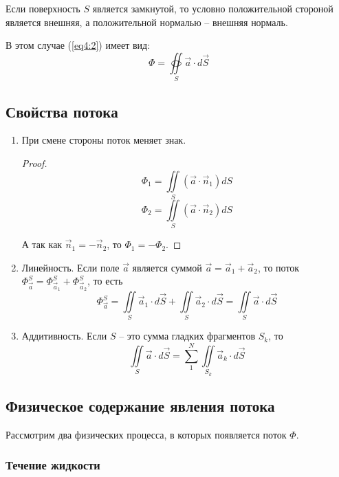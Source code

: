 	\begin{remark}
	Если поверхность \( S \) является замкнутой, то условно положительной стороной является внешняя, а положительной нормалью -- внешняя нормаль.
	
	В этом случае (\ref{eq4:2}) имеет вид:
	\begin{equation}
		\Phi = \oiint\limits_S \vec{a}\cdot d\vec{S}
	\end{equation}
	\end{remark}
	
\subsection{Свойства потока}

	\begin{enumerate}
	\item При смене стороны поток меняет знак.
	
	\begin{proof}
	\[ \Phi_1 = \iint\limits_S (\vec{a}\cdot\vec{n}_1)dS \]
	\[ \Phi_2 = \iint\limits_S (\vec{a}\cdot\vec{n}_2)dS \]
	
	А так как \( \vec{n}_1 = -\vec{n}_2 \), то \( \Phi_1 = -\Phi_2 \).
	\end{proof}
	
	\item Линейность.
	Если поле \( \vec{a} \) является суммой \( \vec{a} = \vec{a}_1 + \vec{a}_2 \), то поток \( \Phi_{\vec{a}}^S = \Phi_{\vec{a}_1}^S + \Phi_{\vec{a}_2}^S \), то есть
	\[ \Phi_{\vec{a}}^S = \iint\limits_S \vec{a}_1\cdot d\vec{S} + \iint\limits_S \vec{a}_2\cdot d\vec{S} = \iint\limits_S \vec{a}\cdot d\vec{S} \]
	
	\item Аддитивность.
	Если \( S \) -- это сумма гладких фрагментов \( S_k \), то
	\[ \iint\limits_S \vec{a}\cdot d\vec{S} = \sum\limits_1^N \iint\limits_{S_k} \vec{a}_k\cdot d\vec{S} \]
	
	\end{enumerate}
	
\subsection{Физическое содержание явления потока}

	Рассмотрим два физических процесса, в которых появляется поток \( \Phi \).
	
\subsubsection{Течение жидкости}


